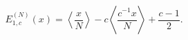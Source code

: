 $$E_{1,c}^{(N)}(x) = \left\langle \frac{x}{N} \right\rangle - c \left\langle \frac{c^{-1}x}{N} \right\rangle + \frac{c-1}{2}.$$

